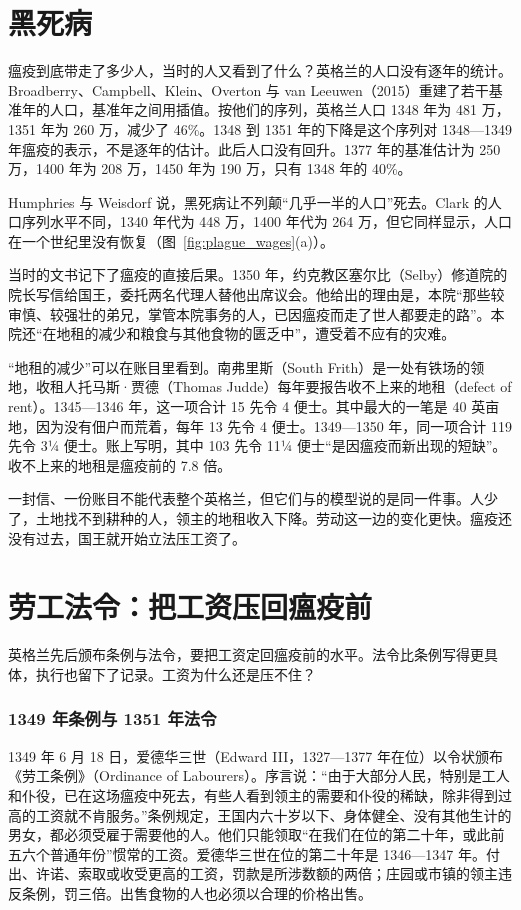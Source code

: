 \section{黑死病}\label{sec:medieval-plague}

瘟疫到底带走了多少人，当时的人又看到了什么？英格兰的人口没有逐年的统计。Broadberry、Campbell、Klein、Overton 与 van Leeuwen（2015）重建了若干基准年的人口，基准年之间用插值\cite{broadberry2015}。按他们的序列，英格兰人口 1348 年为 481 万，1351 年为 260 万，减少了 46\%。1348 到 1351 年的下降是这个序列对 1348—1349 年瘟疫的表示，不是逐年的估计。此后人口没有回升。1377 年的基准估计为 250 万，1400 年为 208 万，1450 年为 190 万，只有 1348 年的 40\%。

Humphries 与 Weisdorf 说，黑死病让不列颠“几乎一半的人口”死去\cite{hw2019}。Clark 的人口序列水平不同，1340 年代为 448 万，1400 年代为 264 万，但它同样显示，人口在一个世纪里没有恢复（图~\ref{fig:plague_wages}(a)）。

当时的文书记下了瘟疫的直接后果。1350 年，约克教区塞尔比（Selby）修道院的院长写信给国王，委托两名代理人替他出席议会。他给出的理由是，本院“那些较审慎、较强壮的弟兄，掌管本院事务的人，已因瘟疫而走了世人都要走的路”。本院还“在地租的减少和粮食与其他食物的匮乏中”，遭受着不应有的灾难\cite{bbt1914}。

“地租的减少”可以在账目里看到。南弗里斯（South Frith）是一处有铁场的领地，收租人托马斯·贾德（Thomas Judde）每年要报告收不上来的地租（defect of rent）。1345—1346 年，这一项合计 15 先令 4 便士。其中最大的一笔是 40 英亩地，因为没有佃户而荒着，每年 13 先令 4 便士。1349—1350 年，同一项合计 119 先令 3¼ 便士。账上写明，其中 103 先令 11¼ 便士“是因瘟疫而新出现的短缺”\cite{bbt1914}。收不上来的地租是瘟疫前的 7.8 倍。

一封信、一份账目不能代表整个英格兰，但它们与的模型说的是同一件事。人少了，土地找不到耕种的人，领主的地租收入下降。劳动这一边的变化更快。瘟疫还没有过去，国王就开始立法压工资了。

\section{劳工法令：把工资压回瘟疫前}\label{sec:medieval-statute}

英格兰先后颁布条例与法令，要把工资定回瘟疫前的水平。法令比条例写得更具体，执行也留下了记录。工资为什么还是压不住？

\subsubsection{1349 年条例与 1351 年法令}
1349 年 6 月 18 日，爱德华三世（Edward III，1327—1377 年在位）以令状颁布《劳工条例》（Ordinance of Labourers）。序言说：“由于大部分人民，特别是工人和仆役，已在这场瘟疫中死去，有些人看到领主的需要和仆役的稀缺，除非得到过高的工资就不肯服务。”\cite{bbt1914}条例规定，王国内六十岁以下、身体健全、没有其他生计的男女，都必须受雇于需要他的人。他们只能领取“在我们在位的第二十年，或此前五六个普通年份”惯常的工资。爱德华三世在位的第二十年是 1346—1347 年。付出、许诺、索取或收受更高的工资，罚款是所涉数额的两倍；庄园或市镇的领主违反条例，罚三倍。出售食物的人也必须以合理的价格出售\cite{bbt1914}。

